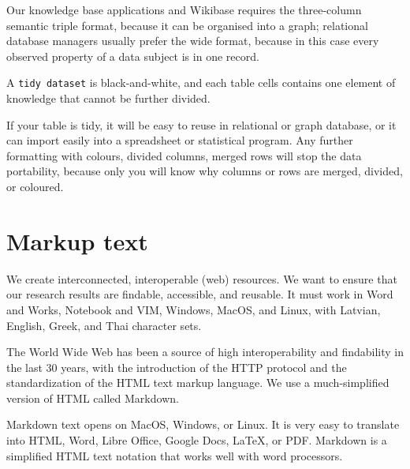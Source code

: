 \documentclass[
  letterpaper,
  DIV=11,
  numbers=noendperiod]{scrreprt}
\begin{document}
Our knowledge base applications and Wikibase requires the three-column
semantic triple format, because it can be organised into a graph;
relational database managers usually prefer the wide format, because in
this case every observed property of a data subject is in one record.

\begin{tcolorbox}[enhanced jigsaw, opacityback=0, bottomrule=.15mm, rightrule=.15mm, toptitle=1mm, breakable, colbacktitle=quarto-callout-note-color!10!white, colback=white, title=\textcolor{quarto-callout-note-color}{\faInfo}\hspace{0.5em}{Note}, leftrule=.75mm, toprule=.15mm, left=2mm, arc=.35mm, colframe=quarto-callout-note-color-frame, coltitle=black, titlerule=0mm, bottomtitle=1mm, opacitybacktitle=0.6]

A \texttt{tidy\ dataset} is black-and-white, and each table cells
contains one element of knowledge that cannot be further divided.

\end{tcolorbox}

If your table is tidy, it will be easy to reuse in relational or graph
database, or it can import easily into a spreadsheet or statistical
program. Any further formatting with colours, divided columns, merged
rows will stop the data portability, because only you will know why
columns or rows are merged, divided, or coloured.

\section{Markup text}\label{sec-markup-text}

We create interconnected, interoperable (web) resources. We want to
ensure that our research results are findable, accessible, and reusable.
It must work in Word and Works, Notebook and VIM, Windows, MacOS, and
Linux, with Latvian, English, Greek, and Thai character sets.

The World Wide Web has been a source of high interoperability and
findability in the last 30 years, with the introduction of the HTTP
protocol and the standardization of the HTML text markup language. We
use a much-simplified version of HTML called Markdown.

Markdown text opens on MacOS, Windows, or Linux. It is very easy to
translate into HTML, Word, Libre Office, Google Docs, LaTeX, or PDF.
Markdown is a simplified HTML text notation that works well with word
processors.
\end{document}

